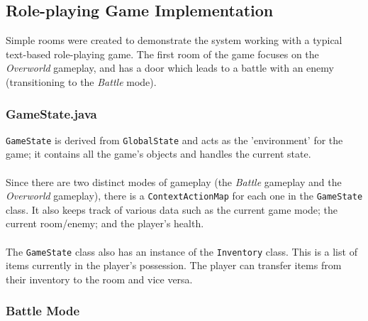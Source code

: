 \documentclass[12pt]{article}
\begin{document}
\subsection{Role-playing Game Implementation}

Simple rooms were created to demonstrate the system working with a typical text-based role-playing game. The first room of the game focuses on the \textit{Overworld} gameplay, and has a door which leads to a battle with an enemy (transitioning to the \textit{Battle} mode).

\subsubsection{GameState.java}

\texttt{GameState} is derived from \texttt{GlobalState} and acts as the 'environment' for the game; it contains all the game's objects and handles the current state.
\\
\\
Since there are two distinct modes of gameplay (the \textit{Battle} gameplay and the \textit{Overworld} gameplay), there is a \texttt{ContextActionMap} for each one in the \texttt{GameState} class. It also keeps track of various data such as the current game mode; the current room/enemy; and the player's health.
\\
\\
The \texttt{GameState} class also has an instance of the \texttt{Inventory} class. This is a list of items currently in the player's possession. The player can transfer items from their inventory to the room and vice versa.

\subsubsection{Battle Mode}
\end{document}
